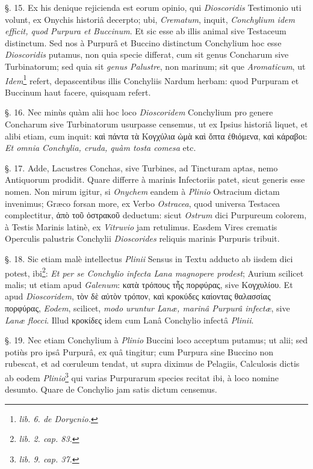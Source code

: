 \documentclass[a4paper, 11pt, oneside, polutonikogreek, german]{article}
\begin{document}
§. 15. Ex his denique rejicienda est eorum opinio, qui \emph{Dioscoridis} Testimonio uti volunt, ex Onychis historiâ decerpto; ubi, \emph{Crematum}, inquit, \emph{Conchylium idem efficit, quod Purpura et Buccinum}. Et sic esse ab illis animal sive Testaceum distinctum. Sed nos à Purpurâ et Buccino distinctum Conchylium hoc esse \emph{Dioscoridis} putamus, non quia specie differat, cum sit genus Concharum sive Turbinatorum; sed quia sit \emph{genus Palustre}, non marinum; sit que \emph{Aromaticum}, ut \emph{Idem}\footnote{\emph{lib. 6. de Dorycnio.}} refert, depascentibus illis Conchyliis Nardum herbam: quod Purpuram et Buccinum haut facere, quisquam refert.

§. 16. Nec minùs quàm alii hoc loco \emph{Dioscoridem} Conchylium pro genere Concharum sive Turbinatorum usurpasse censemus, ut ex Ipsius historiâ liquet, et alibi etiam, cum inquit: καὶ πάντα τὰ Κογχύλια ὠμὰ καὶ ὄπτα ἐθιόμενα, καὶ κάραβοι: \emph{Et omnia Conchylia, cruda, quàm tosta comesa} etc.

§. 17. Adde, Lacustres Conchas, sive Turbines, ad Tincturam aptas, nemo Antiquorum prodidit. Quare differre à marinis Infectoriis patet, sicut generis esse nomen. Non mirum igitur, si \emph{Onychem} eandem à \emph{Plinio} Ostracium dictam invenimus; Græco forsan more, ex Verbo \emph{Ostracea}, quod universa Testacea complectitur, ἀπὸ τοῦ ὀστρακοῦ deductum: sicut \emph{Ostrum} dici Purpureum colorem, à Testis Marinis latinè, ex \emph{Vitruvio} jam retulimus. Easdem Vires crematis Operculis palustris Conchylii \emph{Dioscorides} reliquis marinis Purpuris tribuit.

§. 18. Sic etiam malè intellectus \emph{Plinii} Sensus in Textu adducto ab iisdem dici potest, ibi\footnote{\emph{lib. 2. cap. 83.}}: \emph{Et per se Conchylio infecta Lana magnopere prodest}; Aurium scilicet malis; ut etiam apud \emph{Galenum}: κατὰ τρόπους τἦς πορφύρας, sive Κογχυλίου. Et apud \emph{Dioscoridem}, τὸν δὲ αὐτὸν τρόπον, καὶ κροκύδες καίοντας θαλασσίας πορφύρας, \emph{Eodem}, scilicet, \emph{modo uruntur Lanæ, marinâ Purpurâ infectæ}, sive \emph{Lanæ flocci}. Illud κροκίδες idem cum Lanâ Conchylio infectâ \emph{Plinii}.

§. 19. Nec etiam Conchylium à \emph{Plinio} Buccini loco acceptum putamus; ut alii; sed potiùs pro ipsâ Purpurâ, ex quâ tingitur; cum Purpura sine Buccino non rubescat, et ad cœruleum tendat, ut supra diximus de Pelagiis, Calculosis dictis ab eodem \emph{Plinio}\footnote{\emph{lib. 9. cap. 37.}} qui varias Purpurarum species recitat ibi, à loco nomine desumto. Quare de Conchylio jam satis dictum censemus.
\end{document}
